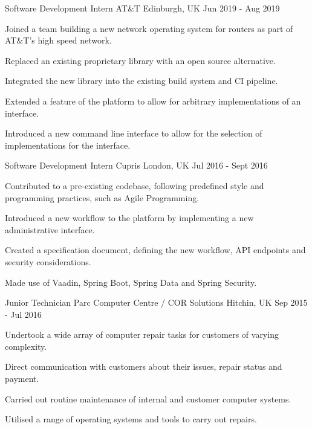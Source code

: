 \begin{cventries}
    \cventry
    {Software Development Intern}
    {AT\&T}
    {Edinburgh, UK}
    {Jun 2019 - Aug 2019}
    {
        \begin{cvitems}
            \item {Joined a team building a new network operating system for routers as part of AT\&T's high speed network.}
            \item {Replaced an existing proprietary library with an open source alternative.}
            \item {Integrated the new library into the existing build system and CI pipeline.}
            \item {Extended a feature of the platform to allow for arbitrary implementations of an interface.}
            \item {Introduced a new command line interface to allow for the selection of implementations for the interface.}
        \end{cvitems}
    }

    \cventry
    {Software Development Intern} %
    {Cupris} %
    {London, UK} %
    {Jul 2016 - Sept 2016} %
    {
        \begin{cvitems} %
            \item {Contributed to a pre-existing codebase, following predefined style and programming practices, such as Agile Programming.}
            \item {Introduced a new workflow to the platform by implementing a new administrative interface.}
            \item {Created a specification document, defining the new workflow, API endpoints and security considerations.}
            \item {Made use of Vaadin, Spring Boot, Spring Data and Spring Security.}
        \end{cvitems}
    }

    \cventry
    {Junior Technician} %
    {Parc Computer Centre / COR Solutions} %
    {Hitchin, UK} %
    {Sep 2015 - Jul 2016} %
    {
        \begin{cvitems} %
            \item {Undertook a wide array of computer repair tasks for customers of varying complexity.}
            \item {Direct communication with customers about their issues, repair status and payment.}
            \item {Carried out routine maintenance of internal and customer computer systems.}
            \item {Utilised a range of operating systems and tools to carry out repairs.}
        \end{cvitems}
    }
\end{cventries}
